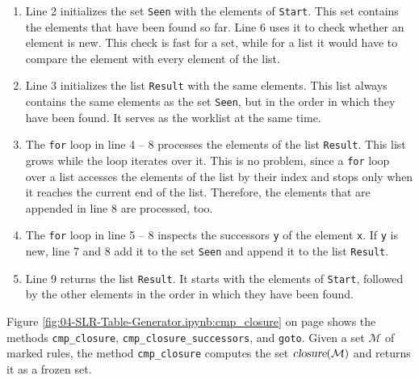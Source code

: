 \begin{enumerate}
\item Line 2 initializes the set \texttt{Seen} with the elements of \texttt{Start}.  This set contains the elements
      that have been found so far.  Line 6 uses it to check whether an element is new.  This check is fast for a
      set, while for a list it would have to compare the element with every element of the list.
\item Line 3 initializes the list \texttt{Result} with the same elements.  This list always contains the same
      elements as the set \texttt{Seen}, but in the order in which they have been found.  It serves as the worklist
      at the same time.
\item The \texttt{for} loop in line 4 -- 8 processes the elements of the list \texttt{Result}.  This list grows
      while the loop iterates over it.  This is no problem, since a \texttt{for} loop over a list accesses the
      elements of the list by their index and stops only when it reaches the current end of the list.  Therefore,
      the elements that are appended in line 8 are processed, too.
\item The \texttt{for} loop in line 5 -- 8 inspects the successors \texttt{y} of the element \texttt{x}.  If
      \texttt{y} is new, line 7 and 8 add it to the set \texttt{Seen} and append it to the list \texttt{Result}.
\item Line 9 returns the list \texttt{Result}.  It starts with the elements of \texttt{Start}, followed by the
      other elements in the order in which they have been found.
\end{enumerate}

\noindent
Figure \ref{fig:04-SLR-Table-Generator.ipynb:cmp_closure} on page \pageref{fig:04-SLR-Table-Generator.ipynb:cmp_closure}
shows the methods \texttt{cmp\_closure}, \texttt{cmp\_closure\_successors}, and \texttt{goto}.  Given a set
$\mathcal{M}$ of marked rules, the method \texttt{cmp\_closure} computes the set $\textsl{closure}(\mathcal{M})$ and
returns it as a frozen set.

